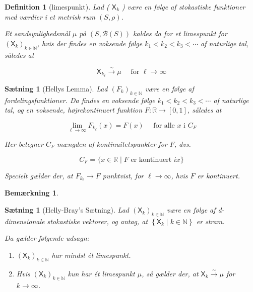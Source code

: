 \documentclass{article}
\newcommand{\1}{\mathbbm{1}}
\newcommand{\X}{\mathsf{X}}
\theoremstyle{boxed}
\newtheorem{definition}[theorem]{Definition}
\newtheorem{remark}[theorem]{Bemærkning}
\newtheorem{proposition}[theorem]{Sætning}
\begin{document}
\begin{theorem-box}
    \begin{definition}[limespunkt]
        Lad ( $\X_k$ ) være en følge af stokastiske funktioner med værdier i et metrisk rum $(S, \rho)$.

Et sandsynlighedsmål $\mu$ på $(S, \mathcal{B}(S))$ kaldes da for et limespunkt for $\left(\X_k\right)_{k \in \mathbb{N}}$, hvis der findes en voksende følge $k_1<k_2<k_3<\cdots$ af naturlige tal, således at

$$
\X_{k_{\ell}} \xrightarrow{\sim} \mu \quad \text { for } \ell \rightarrow \infty
$$

    \end{definition}
\end{theorem-box}
\begin{theorem-box}
    \begin{proposition}[Hellys Lemma]
        Lad $\left(F_k\right)_{k \in \mathbb{N}}$ være en følge af fordelingsfunktioner.
Da findes en voksende følge $k_1<k_2<k_3<\cdots$ af naturlige tal, og en voksende, højrekontinuert funktion $F: \mathbb{R} \rightarrow[0,1]$, således at

$$
\lim _{\ell \rightarrow \infty} F_{k_{\ell}}(x)=F(x) \quad \text { for alle } x \text { i } C_F
$$


Her betegner $C_F$ mængden af kontinuitetspunkter for $F$, dvs.

$$
C_F=\{x \in \mathbb{R} \mid F \text { er kontinuert } i x\}
$$


Specielt gælder der, at $F_{k_{\ell}} \rightarrow F$ punktvist, for $\ell \rightarrow \infty$, hvis $F$ er kontinuert.
    \end{proposition}
\end{theorem-box}
\begin{remark}
    
\end{remark}
\begin{theorem-box}
    \begin{proposition}[Helly-Bray's Sætning]
        Lad $\left(\X_k\right)_{k \in \mathbb{N}}$ være en følge af d-dimensionale stokastiske vektorer, og antag, at $\left\{\X_k \mid k \in \mathbb{N}\right\}$ er stram.

Da gælder følgende udsagn:
\begin{enumerate}
    \item[\textnormal{(i)}] $\left(\X_k\right)_{k \in \mathbb{N}}$ har mindst ét limespunkt.
    \item[\textnormal{(ii)}] Hvis $\left(\X_k\right)_{k \in \mathbb{N}}$ kun har ét limespunkt $\mu$, så gælder der, at $\X_k \xrightarrow{\sim} \mu$ for $k \rightarrow \infty$.
\end{enumerate}
    \end{proposition}
\end{theorem-box}
\end{document}
